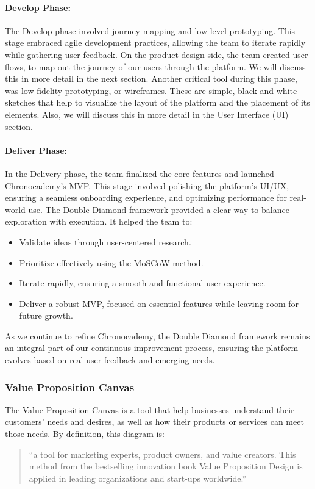 \paragraph{Develop Phase:}
The Develop phase involved journey mapping and low level prototyping.
This stage embraced agile development practices, allowing the team to iterate rapidly while gathering user feedback.
On the product design side, the team created user flows, to map out the journey of our users through the platform.
We will discuss this in more detail in the next section.\newline
Another critical tool during this phase, was low fidelity prototyping, or wireframes.
These are simple, black and white sketches that help to visualize the layout of the platform and the placement of its elements.
Also, we will discuss this in more detail in the User Interface (UI) section.\newline

\paragraph{Deliver Phase:}
In the Delivery phase, the team finalized the core features and launched Chronocademy's MVP. This stage involved polishing the platform’s UI/UX, ensuring a seamless onboarding experience, and optimizing performance for real-world use.
The Double Diamond framework provided a clear way to balance exploration with execution.
It helped the team to:
\begin{itemize}
    \item Validate ideas through user-centered research.
    \item Prioritize effectively using the MoSCoW method.
    \item Iterate rapidly, ensuring a smooth and functional user experience.
    \item Deliver a robust MVP, focused on essential features while leaving room for future growth.
\end{itemize}
As we continue to refine Chronocademy, the Double Diamond framework remains an integral part of our continuous improvement process, ensuring the platform evolves based on real user feedback and emerging needs.

\subsubsection{Value Proposition Canvas}\label{subsubsec:value-proposition-canvas}
The Value Proposition Canvas is a tool that help businesses understand their customers' needs and desires, as well as how their products or services can meet those needs.
By definition, this diagram is:
\begin{quote}
    ``a tool for marketing experts, product
    owners, and value creators.
    This method from the bestselling innovation
    book Value Proposition Design is applied in leading organizations and
    start-ups worldwide.''~\cite[Value Proposition Canvas]{valuePropositionCanvas}
\end{quote}

